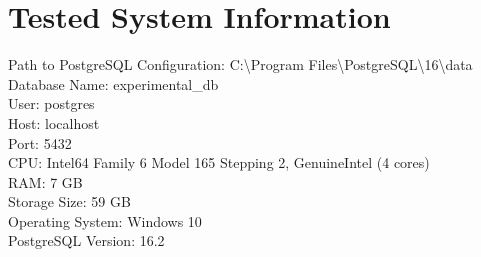 
            \newpage
            \section*{Tested System Information}
            \noindent Path to PostgreSQL Configuration: C:\textbackslash{}Program Files\textbackslash{}PostgreSQL\textbackslash{}16\textbackslash{}data \\
            Database Name: experimental\_db \\
            User: postgres \\
            Host: localhost \\
            Port: 5432 \\
            CPU: Intel64 Family 6 Model 165 Stepping 2, GenuineIntel (4 cores) \\
            RAM: 7 GB \\
            Storage Size: 59 GB \\
            Operating System: Windows 10 \\
            PostgreSQL Version: 16.2
                